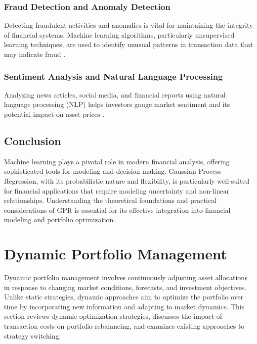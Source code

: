 \subsubsection{Fraud Detection and Anomaly Detection}

Detecting fraudulent activities and anomalies is vital for maintaining the integrity of financial systems. Machine learning algorithms, particularly unsupervised learning techniques, are used to identify unusual patterns in transaction data that may indicate fraud \cite{phua2010comprehensive}.

\subsubsection{Sentiment Analysis and Natural Language Processing}

Analyzing news articles, social media, and financial reports using natural language processing (NLP) helps investors gauge market sentiment and its potential impact on asset prices \cite{hagenau2013automated}.


\subsection{Conclusion}

Machine learning plays a pivotal role in modern financial analysis, offering sophisticated tools for modeling and decision-making. Gaussian Process Regression, with its probabilistic nature and flexibility, is particularly well-suited for financial applications that require modeling uncertainty and non-linear relationships. Understanding the theoretical foundations and practical considerations of GPR is essential for its effective integration into financial modeling and portfolio optimization.


\section{Dynamic Portfolio Management}

Dynamic portfolio management involves continuously adjusting asset allocations in response to changing market conditions, forecasts, and investment objectives. Unlike static strategies, dynamic approaches aim to optimize the portfolio over time by incorporating new information and adapting to market dynamics. This section reviews dynamic optimization strategies, discusses the impact of transaction costs on portfolio rebalancing, and examines existing approaches to strategy switching.

